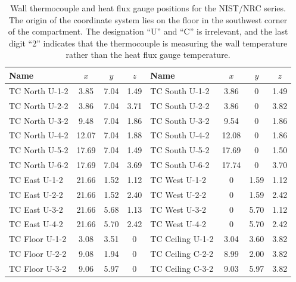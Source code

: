 \begin{table}[p]
\caption[Wall measurement positions for the NIST/NRC series]
{Wall thermocouple and heat flux gauge positions for the NIST/NRC series. The origin of the coordinate system lies on the floor in the southwest
corner of the compartment. The designation ``U'' and ``C'' is irrelevant, and the last digit ``2'' indicates that the thermocouple is measuring the wall temperature rather than the heat flux gauge temperature.}
\begin{center}
\begin{tabular}{|l|c|c|c||l|c|c|c|}
\hline
Name              & $x$   & $y$  & $z$      & Name              & $x$   & $y$   & $z$       \\ \hline \hline
TC North U-1-2    & 3.85  & 7.04 & 1.49     & TC South U-1-2    & 3.86  & 0     & 1.49      \\ \hline
TC North U-2-2    & 3.86  & 7.04 & 3.71     & TC South U-2-2    & 3.86  & 0     & 3.82      \\ \hline
TC North U-3-2    & 9.48  & 7.04 & 1.86     & TC South U-3-2    & 9.54  & 0     & 1.86      \\ \hline
TC North U-4-2    & 12.07 & 7.04 & 1.88     & TC South U-4-2    & 12.08 & 0     & 1.86      \\ \hline
TC North U-5-2    & 17.69 & 7.04 & 1.49     & TC South U-5-2    & 17.69 & 0     & 1.50      \\ \hline
TC North U-6-2    & 17.69 & 7.04 & 3.69     & TC South U-6-2    & 17.74 & 0     & 3.70      \\ \hline \hline
TC East U-1-2     & 21.66 & 1.52 & 1.12     & TC West U-1-2     & 0     & 1.59  & 1.12      \\ \hline
TC East U-2-2     & 21.66 & 1.52 & 2.40     & TC West U-2-2     & 0     & 1.59  & 2.42      \\ \hline
TC East U-3-2     & 21.66 & 5.68 & 1.13     & TC West U-3-2     & 0     & 5.70  & 1.12      \\ \hline
TC East U-4-2     & 21.66 & 5.70 & 2.42     & TC West U-4-2     & 0     & 5.70  & 2.42      \\ \hline \hline
TC Floor U-1-2    & 3.08  & 3.51 & 0        & TC Ceiling U-1-2  & 3.04  & 3.60  & 3.82      \\ \hline
TC Floor U-2-2    & 9.08  & 1.94 & 0        & TC Ceiling C-2-2  & 8.99  & 2.00  & 3.82      \\ \hline
TC Floor U-3-2    & 9.06  & 5.97 & 0        & TC Ceiling C-3-2  & 9.03  & 5.97  & 3.82      \\ \hline

\end{tabular}
\end{center}
\end{table}
